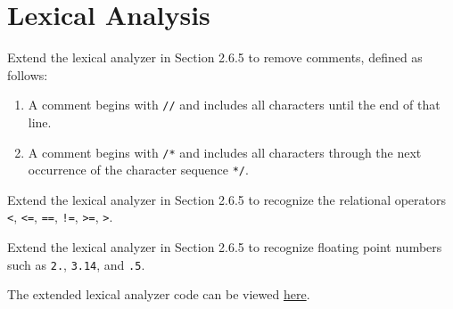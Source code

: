 \setcounter{section}{5}
\section{Lexical Analysis}

\begin{exercise}\label{ex:020601}
    Extend the lexical analyzer in Section 2.6.5 to remove comments, defined as 
    follows:
    \begin{enumerate}[label=\alph*)]
        \item A comment begins with \texttt{//} and includes all characters until 
        the end of that line.
        \item A comment begins with \texttt{/*} and includes all characters 
        through the next occurrence of the character sequence \texttt{*/}.
    \end{enumerate}
\end{exercise}

\begin{exercise}\label{ex:020602}
    Extend the lexical analyzer in Section 2.6.5 to recognize the relational
    operators \texttt{<}, \texttt{<=}, \texttt{==}, \texttt{!=}, \texttt{>=},
    \texttt{>}.
\end{exercise}

\begin{exercise}\label{ex:020603}
    Extend the lexical analyzer in Section 2.6.5 to recognize floating point 
    numbers such as \texttt{2.}, \texttt{3.14}, and \texttt{.5}.
\end{exercise}
\begin{solution}\label{sol:0206}
    The extended lexical analyzer code can be viewed 
    \href{https://github.com/goats-9/exercises/tree/main/compilers/02/06/Lexer.java}{here}.
\end{solution}